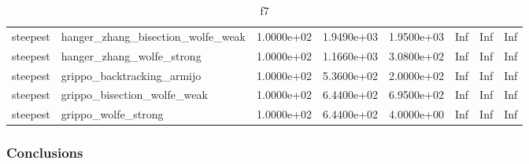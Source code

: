 \documentclass[a4paper,11pt]{article}
\numberwithin{equation}{section} %
\begin{document}
\begin{table}[h!]
{\begin{tabular}{|l|l|l|l|l|l|l|l|}
        steepest & hanger\_zhang\_bisection\_wolfe\_weak & 1.0000e+02 & 1.9490e+03 & 1.9500e+03 & Inf & Inf & Inf \\
        steepest & hanger\_zhang\_wolfe\_strong & 1.0000e+02 & 1.1660e+03 & 3.0800e+02 & Inf & Inf & Inf \\
        steepest & grippo\_backtracking\_armijo & 1.0000e+02 & 5.3600e+02 & 2.0000e+02 & Inf & Inf & Inf \\
        steepest & grippo\_bisection\_wolfe\_weak & 1.0000e+02 & 6.4400e+02 & 6.9500e+02 & Inf & Inf & Inf \\
        steepest & grippo\_wolfe\_strong & 1.0000e+02 & 6.4400e+02 & 4.0000e+00 & Inf & Inf & Inf \\

\end{tabular}}
\caption{f7}
\label{table:f7}
\end{table}

\clearpage


\subsubsection{Conclusions}
\end{document}
